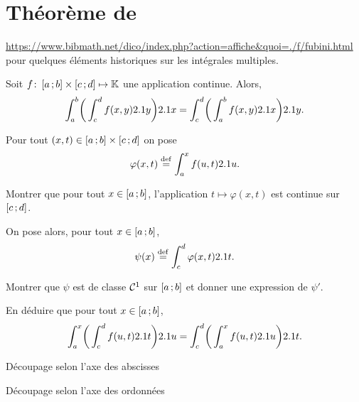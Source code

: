 \section{Théorème de }

\url{https://www.bibmath.net/dico/index.php?action=affiche&quoi=./f/fubini.html} pour quelques éléments historiques sur les intégrales multiples. 


\begin{theo}
    Soit $\fonctionligne[f]{\interff{a}{b} \times \interff{c}{d}}{\K}$ une application continue. Alors,
    \[
    \int_{a}^{b} \mathopen{}\bigg( \int_{c}^{d} f(x,y) \d y \bigg) \d x = \int_{c}^{d} \mathopen{}\bigg( \int_{a}^{b} f(x,y) \d x \bigg) \d y.
    \]
\end{theo}

\begin{exercice}
    Pour tout $(x, t) \in \interff{a}{b} \times \interff{c}{d}$ on pose 
    $$\varphi(x, t) \defeq \int_{a}^{x} f(u, t) \d u.$$
    \begin{questions}
    \item Montrer que pour tout $x \in \interff{a}{b}$, l'application $t \mapsto \varphi(x, t)$ est continue sur $\interff{c}{d}$.
    \end{questions}

    On pose alors, pour tout $x  \in \interff{a}{b}$,
    $$\psi(x) \defeq \int_{c}^{d} \varphi(x, t) \d t.$$
    \begin{questions}[resume]
        \item Montrer que $\psi$ est de classe $\Cont^1$ sur $\interff{a}{b}$ et donner une expression de $\psi'$.
        \item En déduire que pour tout $x \in \interff{a}{b}$,
        \[
        \int_{a}^{x} \mathopen{}\bigg( \int_{c}^{d} f(u,t) \d t \bigg) \d u = \int_{c}^{d} \mathopen{}\bigg( \int_{a}^{x} f(u,t) \d u \bigg) \d t.
        \]
    \end{questions}
\end{exercice}


\begin{marginfigure}[-5cm]
    \centering
    
    \caption{Découpage selon l'axe des abscisses}
\end{marginfigure}
\begin{marginfigure}[0cm]
    \centering
    
    \caption{Découpage selon l'axe des ordonnées}
\end{marginfigure}

